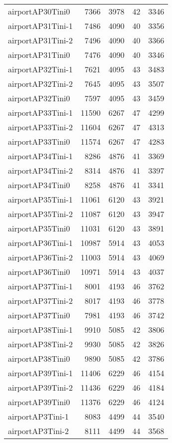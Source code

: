 \begin{longtable}{lrrrr}
airportAP30Tini0 & 7366 & 3978 & 42 & 3346 \\
airportAP31Tini-1 & 7486 & 4090 & 40 & 3356 \\
airportAP31Tini-2 & 7496 & 4090 & 40 & 3366 \\
airportAP31Tini0 & 7476 & 4090 & 40 & 3346 \\
airportAP32Tini-1 & 7621 & 4095 & 43 & 3483 \\
airportAP32Tini-2 & 7645 & 4095 & 43 & 3507 \\
airportAP32Tini0 & 7597 & 4095 & 43 & 3459 \\
airportAP33Tini-1 & 11590 & 6267 & 47 & 4299 \\
airportAP33Tini-2 & 11604 & 6267 & 47 & 4313 \\
airportAP33Tini0 & 11574 & 6267 & 47 & 4283 \\
airportAP34Tini-1 & 8286 & 4876 & 41 & 3369 \\
airportAP34Tini-2 & 8314 & 4876 & 41 & 3397 \\
airportAP34Tini0 & 8258 & 4876 & 41 & 3341 \\
airportAP35Tini-1 & 11061 & 6120 & 43 & 3921 \\
airportAP35Tini-2 & 11087 & 6120 & 43 & 3947 \\
airportAP35Tini0 & 11031 & 6120 & 43 & 3891 \\
airportAP36Tini-1 & 10987 & 5914 & 43 & 4053 \\
airportAP36Tini-2 & 11003 & 5914 & 43 & 4069 \\
airportAP36Tini0 & 10971 & 5914 & 43 & 4037 \\
airportAP37Tini-1 & 8001 & 4193 & 46 & 3762 \\
airportAP37Tini-2 & 8017 & 4193 & 46 & 3778 \\
airportAP37Tini0 & 7981 & 4193 & 46 & 3742 \\
airportAP38Tini-1 & 9910 & 5085 & 42 & 3806 \\
airportAP38Tini-2 & 9930 & 5085 & 42 & 3826 \\
airportAP38Tini0 & 9890 & 5085 & 42 & 3786 \\
airportAP39Tini-1 & 11406 & 6229 & 46 & 4154 \\
airportAP39Tini-2 & 11436 & 6229 & 46 & 4184 \\
airportAP39Tini0 & 11376 & 6229 & 46 & 4124 \\
airportAP3Tini-1 & 8083 & 4499 & 44 & 3540 \\
airportAP3Tini-2 & 8111 & 4499 & 44 & 3568 \\

\end{longtable}
